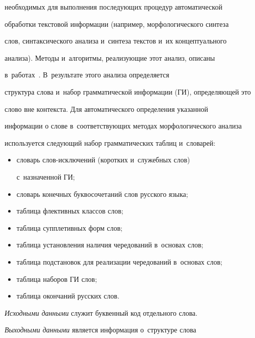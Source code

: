 необходимых для выполнения последующих процедур автоматической 


обработки текстовой информации (например, морфологического синтеза 


слов, синтаксического анализа и~синтеза текстов и~их концептуального 


анализа). Методы и~алгоритмы, реализующие этот анализ, описаны 


в~работах~\cite{3-kl, 2-kl, 1-kl}. В~результате этого анализа определяется 


структура слова и~набор грамматической информации (ГИ), определяющей это 


слово вне контекста. Для автоматического определения указанной 


информации о слове в~соответствующих методах морфологического анализа 


используется следующий набор грамматических таблиц и~словарей:


  \begin{itemize}


  \item словарь слов-исключений (коротких и~служебных слов) 


  с~назначенной ГИ;


  \item словарь конечных буквосочетаний слов русского языка;


  \item таблица флективных классов слов;


  \item таблица супплетивных форм слов;


  \item таблица установления наличия чередований в~основах слов;


  \item таблица подстановок для реализации чередований в~основах слов;


  \item таблица наборов ГИ слов;


  \item таблица окончаний русских слов.


\end{itemize}





  \textit{Исходными данными} служит буквенный код отдельного слова.


  


  \textit{Выходными данными} является информация о~структуре слова 


